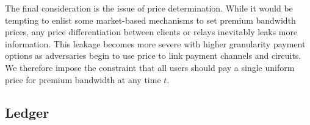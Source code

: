 The final consideration is the issue of price determination. While it would be
tempting to enlist some market-based mechanisms to set premium bandwidth prices,
any price differentiation between clients or relays inevitably leaks more
information. This leakage becomes more severe with higher granularity payment
options as adversaries begin to use price to link payment channels and circuits.
We therefore impose the constraint that all users should pay a single uniform
price for premium bandwidth at any time $t$.




%


\subsection{Ledger}

